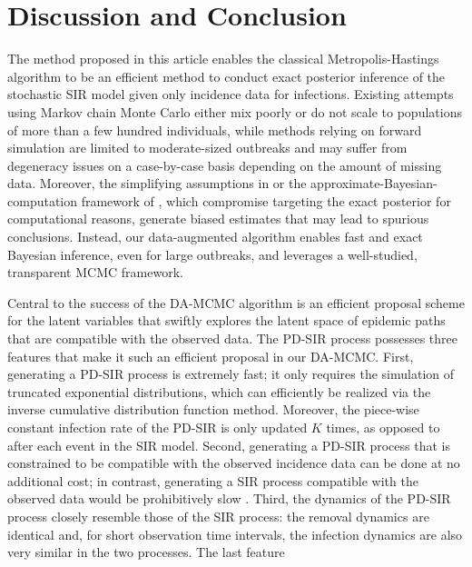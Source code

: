 \documentclass[11pt]{article}
\begin{document}
	\section{Discussion and Conclusion}
	\label{sec:dis}
	The method proposed in this article enables the classical Metropolis-Hastings algorithm to be an efficient method to conduct exact posterior inference of the stochastic SIR model given only incidence data for infections. Existing attempts using Markov chain Monte Carlo either mix poorly or do not scale to populations of more than a few hundred individuals, while methods relying on forward simulation are limited to moderate-sized outbreaks and may suffer from degeneracy issues on a case-by-case basis depending on the amount of missing data. Moreover, the simplifying assumptions in \cite{Fintzi.2020} or the approximate-Bayesian-computation framework of \cite{McKinley.2018}, which compromise targeting the exact posterior for computational reasons, generate biased estimates that may lead to spurious conclusions. Instead, our data-augmented algorithm enables fast and exact Bayesian inference, even for large outbreaks, and leverages a well-studied, transparent MCMC framework. %
	
	Central to the success of the DA-MCMC algorithm is an efficient proposal scheme for the latent variables that swiftly explores the latent space of epidemic paths that are compatible with the observed data. The PD-SIR process possesses three features that make it such an efficient proposal in our DA-MCMC. First, generating a PD-SIR process is extremely fast; it only requires the simulation of truncated exponential distributions, which can efficiently be realized via the inverse cumulative distribution function method. Moreover, the piece-wise constant infection rate of the PD-SIR is only updated $K$ times, as opposed to after each event in the SIR model. Second, generating a PD-SIR process that is constrained to be compatible with the observed incidence data can be done at no additional cost; in contrast, generating a SIR process compatible with the observed data would be prohibitively slow \cite{Hobolth.2009}. Third, the dynamics of the PD-SIR process closely resemble those of the SIR process: the removal dynamics are identical and, for short observation time intervals, the infection dynamics are also very similar in the two processes. The last feature 
	
\end{document}
